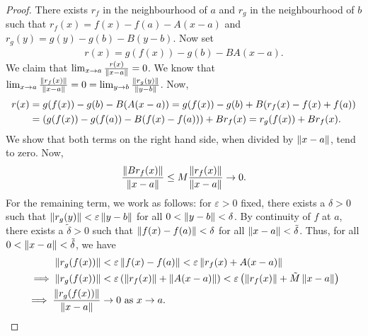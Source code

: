 \begin{proof}
    There exists $r_{f}$ in the neighbourhood of $a$ and $r_{g}$ in the neighbourhood of $b$ such that $r_{f}(x) = f(x)-f(a)-A(x-a)$ and $r_{g}(y) = g(y)-g(b)-B(y-b)$. Now set
    \begin{align}
        r(x) = g(f(x)) - g(b) - BA(x-a).
    \end{align}
    We claim that $\lim_{x \to a} \frac{r(x)}{\left\lVert x-a\right\rVert} = 0$. We know that $\lim_{x \to a} \frac{\left\lVert r_{f}(x)\right\rVert}{\left\lVert x-a\right\rVert} = 0 = \lim_{y \to b} \frac{\left\lVert r_{g}(y)\right\rVert}{\left\lVert y-b\right\rVert}$. Now,
    \begin{align}
        r(x) &= g(f(x))-g(b)-B(A(x-a)) = g(f(x)) - g(b) + B(r_{f}(x)-f(x)+f(a)) \notag\\
        &= \left( g(f(x)) - g(f(a)) - B(f(x)-f(a)) \right) + Br_{f}(x) \notag = r_{g}(f(x)) + Br_{f}(x).
    \end{align}
    We show that both terms on the right hand side, when divided by $\left\lVert x-a\right\rVert$, tend to zero. Now,
    \begin{align}
        \frac{\left\lVert Br_{f}(x)\right\rVert}{\left\lVert x-a\right\rVert} \leq M\frac{\left\lVert r_{f}(x)\right\rVert}{\left\lVert x-a\right\rVert} \to 0.
    \end{align}
    For the remaining term, we work as follows: for $\varepsilon > 0$ fixed, there exists a $\delta > 0$ such that $\left\lVert r_{g}(y)\right\rVert < \varepsilon\left\lVert y-b\right\rVert$ for all $0 < \left\lVert y-b\right\rVert < \delta$. By continuity of $f$ at $a$, there exists a $\tilde{\delta} > 0$ such that $\left\lVert f(x)-f(a)\right\rVert < \delta$ for all $\left\lVert x-a\right\rVert < \tilde{\delta}$. Thus, for all $0 < \left\lVert x-a\right\rVert < \tilde{\delta}$, we have
    \begin{align}
        \left\lVert r_{g}(f(x))\right\rVert &< \varepsilon \left\lVert f(x)-f(a)\right\rVert < \varepsilon \left\lVert r_{f}(x)+A(x-a)\right\rVert \\
        \implies \left\lVert r_{g}(f(x))\right\rVert &< \varepsilon \left( \left\lVert r_{f}(x)\right\rVert + \left\lVert A(x-a)\right\rVert \right) < \varepsilon \left( \left\lVert r_{f}(x)\right\rVert + \tilde{M} \left\lVert x-a\right\rVert \right) \notag \\
        \implies \frac{\left\lVert r_{g}(f(x))\right\rVert}{\left\lVert x-a\right\rVert} &\to 0 \text{ as } x \to a.
    \end{align}
\end{proof}